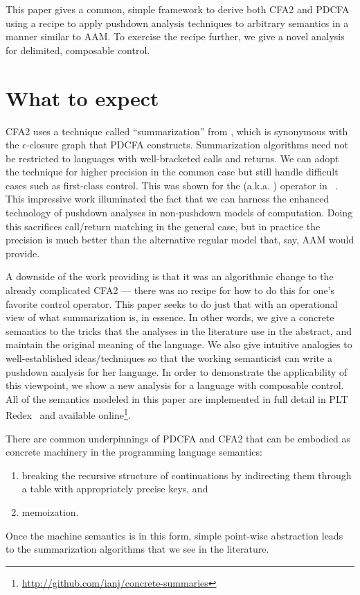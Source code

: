 \documentclass{llncs}
\newcommand{\Scribtexttt}[1]{{\texttt{#1}}}
\newcommand{\SColorize}[2]{\color{#1}{#2}}
\newcommand{\inColor}[2]{{\Scribtexttt{\SColorize{#1}{#2}}}}
\newcommand{\rackett}[1]{\inColor{black}{#1}}
\begin{document}
This paper gives a common, simple framework to derive both CFA2 and
PDCFA using a recipe to apply pushdown analysis techniques to
arbitrary semantics in a manner similar to AAM. To exercise the recipe further, 
we give a novel analysis for delimited, composable control. \\

\section{What to expect}

CFA2 uses a technique called ``summarization'' from
\citet[Chapter 7]{local:muchnick:jones:flow-analysis:1981}, which is synonymous with the
$\epsilon$-closure graph that PDCFA constructs. Summarization
algorithms need not be restricted to languages with well-bracketed
calls and returns. We can adopt the technique for higher precision in
the common case but still handle difficult cases such as first-class
control. This was shown for the
\rackett{call-with-current-continuation} (a.k.a. \rackett{call/cc})
operator in ~\citet{ianjohnson:Vardoulakis2011Pushdown}. This
impressive work illuminated the fact that we can harness the enhanced
technology of pushdown analyses in non-pushdown models of
computation. Doing this sacrifices call/return matching in the general
case, but in practice the precision is much better than the
alternative regular model that, say, AAM would provide.

A downside of the work providing \rackett{call/cc} is that it was an
algorithmic change to the already complicated CFA2 --- there was no
recipe for how to do this for one's favorite control operator. This
paper seeks to do just that with an operational view of what
summarization is, in essence. In other words, we give a concrete
semantics to the tricks that the analyses in the literature use in the
abstract, and maintain the original meaning of the language. We also
give intuitive analogies to well-established ideas/techniques so that
the working semanticist can write a pushdown analysis for her
language. In order to demonstrate the applicability of this viewpoint,
we show a new analysis for a language with composable control. All of
the semantics modeled in this paper are implemented in full detail in
PLT Redex~\citep{ianjohnson:Felleisen:2009:SEP:1795772} and available
online\footnote{\url{http://github.com/ianj/concrete-summaries}}.

There are common underpinnings of PDCFA and CFA2 that can be embodied
as concrete machinery in the programming language semantics: 
\begin{enumerate}
\item{breaking the recursive structure of continuations by indirecting them through a
table with appropriately precise keys, and}
\item{memoization.}
\end{enumerate}
Once the machine semantics is in this form, simple point-wise
abstraction leads to the summarization algorithms that we see in the
literature.
\end{document}
